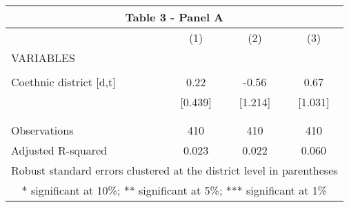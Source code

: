 \begin{tabular}{lccc}
\multicolumn{4}{c}{Table 3 - Panel A} \\ \hline
 & (1) & (2) & (3) \\
VARIABLES &  &  &  \\ \hline
 &  &  &  \\
Coethnic district [d,t] & 0.22 & -0.56 & 0.67 \\
 & [0.439] & [1.214] & [1.031] \\
 &  &  &  \\
 &  &  &  \\
Observations & 410 & 410 & 410 \\
 Adjusted R-squared & 0.023 & 0.022 & 0.060 \\ \hline
\multicolumn{4}{c}{ Robust standard errors clustered at the district level in parentheses} \\
\multicolumn{4}{c}{ * significant at 10\%; ** significant at 5\%; *** significant at 1\%} \\
\end{tabular}
